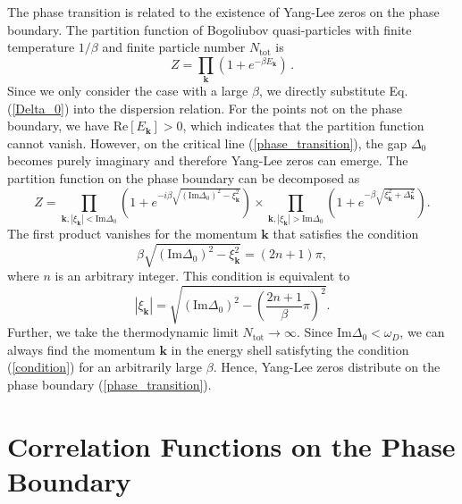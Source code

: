 \documentclass[aps,onecolumn,nofootinbib,superscriptaddress,notitlepage,longbibliography]{revtex4-1}
\begin{document}
The phase transition is related to the existence of Yang-Lee zeros on the phase boundary. The partition function of Bogoliubov quasi-particles with finite temperature $1/\beta$ and finite particle number $N_{\text{tot}}$ is
\begin{equation}
  Z = \prod_{\bm{k}} (1 + e^{-\beta E_{\bm{k}}})\,.
\end{equation}
 Since we only consider the case with a large $\beta$, we directly substitute Eq. (\ref{Delta_0}) into the dispersion relation. For the points not on the phase boundary, we have $\text{Re}
 [E_{\bm{k}}] > 0$, which indicates that the
 partition function cannot vanish. However, on the critical line (\ref{phase_transition}), the gap $\Delta_0$ becomes purely imaginary and therefore Yang-Lee zeros can emerge. The partition function on the phase boundary can be decomposed as
\begin{equation}
  Z = \prod_{\bm{k},|\xi_{\bm{k}}|<\text{Im}\Delta_0} \left( 1 + e^{- i \beta \sqrt{\left( \text{Im}\Delta_0 \right)^2 - \xi_{\bm{k}}^2}} \right)\times \prod_{\bm{k},|\xi_{\bm{k}}|>\text{Im}\Delta_0}\left( 1 + e^{- \beta \sqrt{\xi_{\bm{k}}^2 +\Delta_{\bm{k}}^2 }} \right).
\end{equation}
The first product vanishes for the momentum $\bm{k}$ that satisfies the condition
\begin{equation}
  \beta \sqrt{\left( \text{Im} \Delta_0 \right)^2 - \xi_{\bm{k}}^2} = (2n + 1) \pi,
\end{equation}
where $n$ is an arbitrary integer. This condition is equivalent to
\begin{equation}
 |\xi_{\bm{k}}| = \sqrt{\left( \text{Im} \Delta_0
  \right)^2 - \left( \frac{2 n + 1}{\beta} \pi \right)^2}.
  \label{condition}
\end{equation}
 Further, we take the thermodynamic limit $N_{\text{tot}}\to\infty$. Since $\text{Im}\Delta_0<\omega_D$, we can always find the momentum $\bm{k}$ in the energy shell satisfyting the condition (\ref{condition}) for an arbitrarily large $\beta$. Hence, Yang-Lee zeros distribute on the phase boundary (\ref{phase_transition}). 

\section{Correlation Functions on the Phase Boundary}\label{SectionOn}
\end{document}
